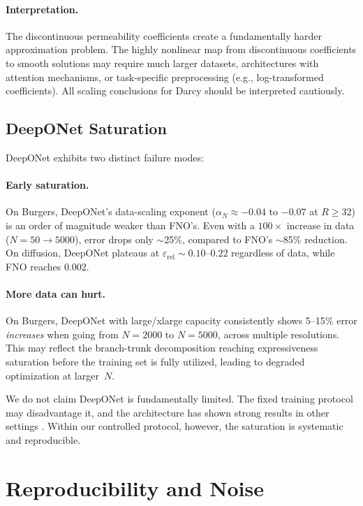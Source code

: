 \documentclass[11pt]{article}
\newcommand{\relLtwo}{\varepsilon_{\mathrm{rel}}}
\begin{document}
\paragraph{Interpretation.}
The discontinuous permeability coefficients create a fundamentally
harder approximation problem. The highly nonlinear map from
discontinuous coefficients to smooth solutions may require much
larger datasets, architectures with attention mechanisms, or
task-specific preprocessing (e.g., log-transformed coefficients).
All scaling conclusions for Darcy should be interpreted cautiously.

\subsection{DeepONet Saturation}
\label{sec:deeponet}

DeepONet exhibits two distinct failure modes:

\paragraph{Early saturation.}
On Burgers, DeepONet's data-scaling exponent ($\alpha_N \approx
-0.04$ to $-0.07$ at $R \geq 32$) is an order of magnitude
weaker than FNO's. Even with a $100\times$ increase in data
($N = 50 \to 5000$), error drops only $\sim$25\%, compared to FNO's
$\sim$85\% reduction. On diffusion, DeepONet plateaus at
$\relLtwo \sim 0.10$--$0.22$ regardless of data, while FNO
reaches 0.002.

\paragraph{More data can hurt.}
On Burgers, DeepONet with large/xlarge capacity consistently
shows 5--15\% error \emph{increases} when going from $N = 2000$
to $N = 5000$, across multiple resolutions. This may reflect
the branch-trunk decomposition reaching expressiveness saturation
before the training set is fully utilized, leading to degraded
optimization at larger~$N$.

We do not claim DeepONet is fundamentally limited. The fixed
training protocol may disadvantage it, and the architecture has
shown strong results in other settings
\citep{wang2021learning}. Within our controlled protocol,
however, the saturation is systematic and reproducible.


\section{Reproducibility and Noise}
\label{sec:noise}
\end{document}
